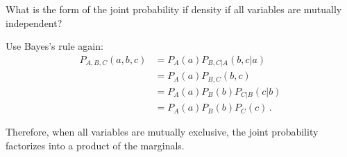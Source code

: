 

What is the form of the joint probability if density if all variables are mutually independent?


Use Bayes's rule again:
\begin{align*}
P_{A,B,C}(a, b, c)
&= P_A(a) P_{B,C|A}(b, c | a) \\
&= P_A(a) P_{B,C}(b, c) \\
&= P_A(a) P_B(b) P_{C|B}(c | b) \\
&= P_A(a) P_B(b) P_C(c) \, .
\end{align*}

Therefore, when all variables are mutually exclusive, the joint probability factorizes into a product of the marginals.
